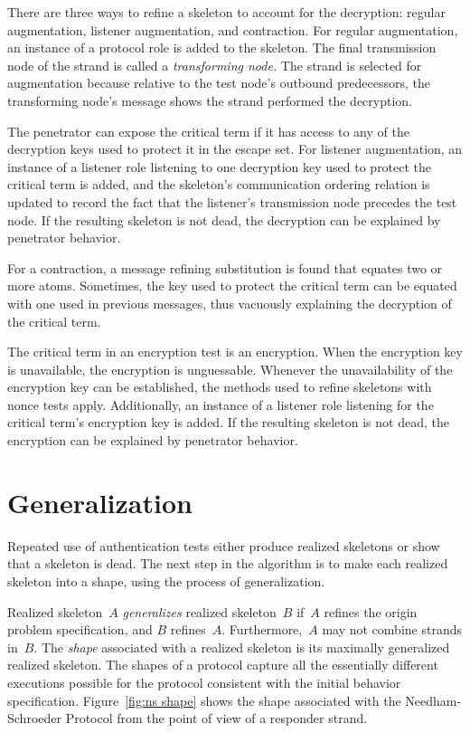 \documentclass[12pt]{article}
\begin{document}
There are three ways to refine a skeleton to account for the
decryption: regular augmentation, listener augmentation, and
contraction.  For regular augmentation, an instance of a protocol role
is added to the skeleton.  The final transmission node of the strand
is called a \emph{transforming node.}  The strand is selected for
augmentation because relative to the test node's outbound
predecessors, the transforming node's message shows the strand
performed the decryption.

The penetrator can expose the critical term if it has access to any
of the decryption keys used to protect it in the escape set.  For
listener augmentation, an instance of a listener role listening to one
decryption key used to protect the critical term is added, and the
skeleton's communication ordering relation is updated to record the
fact that the listener's transmission node precedes the test node.  If
the resulting skeleton is not dead, the decryption can be explained by
penetrator behavior.

For a contraction, a message refining substitution is found that
equates two or more atoms.  Sometimes, the key used to protect the
critical term can be equated with one used in previous messages,
thus vacuously explaining the decryption of the critical term.

The critical term in an encryption test is an encryption.  When the
encryption key is unavailable, the encryption is unguessable.
Whenever the unavailability of the encryption key can be established,
the methods used to refine skeletons with nonce tests apply.
Additionally, an instance of a listener role listening for the
critical term's encryption key is added.  If the resulting skeleton
is not dead, the encryption can be explained by penetrator behavior.

\section{Generalization}

Repeated use of authentication tests either produce realized skeletons
or show that a skeleton is dead.  The next step in the algorithm is to
make each realized skeleton into a shape, using the process of
generalization.

Realized skeleton~$A$ \emph{generalizes}
realized skeleton~$B$ if~$A$ refines the origin problem specification,
and $B$ refines~$A$.  Furthermore,~$A$ may not combine strands in~$B$.
The \emph{shape} associated with a realized skeleton is
its maximally generalized realized skeleton.  The shapes of a protocol
capture all the essentially different executions possible for the
protocol consistent with the initial behavior specification.
Figure~\ref{fig:ns shape} shows the shape associated with the
Needham-Schroeder Protocol from the point of view of a responder
strand.
\end{document}
